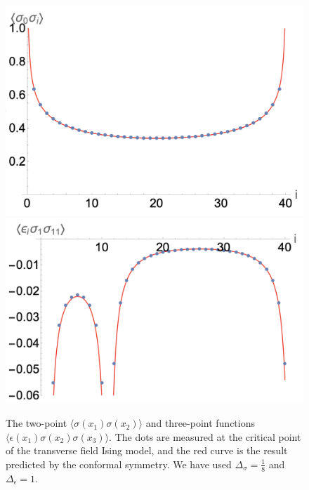 \documentclass[prb,twocolumn,11pt]{revtex4-1}
\begin{document}
\begin{figure}[htbp]
\centering
\includegraphics[scale=0.3]{ss2ptIsing.png}
\includegraphics[scale=0.3]{sse3ptIsing.png}
\caption{The two-point $\langle\sigma(x_1)\sigma(x_2)\rangle$ and three-point functions $\langle\epsilon(x_1)\sigma(x_2)\sigma(x_3)\rangle$. The dots are measured at the critical point of the transverse field Ising model, and the red curve is the result predicted by the conformal symmetry. We have used $\Delta_\sigma=\frac{1}{8}$ and $\Delta_{\epsilon}=1$.}
\label{correlations}
\end{figure}
\end{document}
